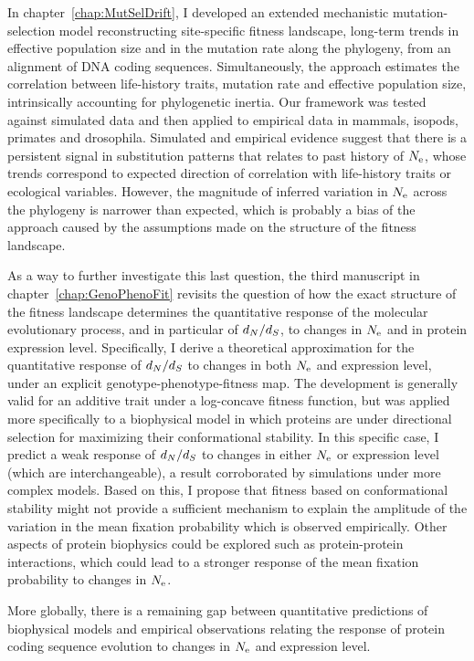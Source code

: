 In chapter~\ref{chap:MutSelDrift}, I developed an extended mechanistic mutation-selection model reconstructing site-specific fitness landscape, long-term trends in effective population size and in the mutation rate along the phylogeny, from an alignment of \acrshort{DNA} coding sequences.
Simultaneously, the approach estimates the correlation between life-history traits, mutation rate and effective population size, intrinsically accounting for phylogenetic inertia.
Our framework was tested against simulated data and then applied to empirical data in mammals, isopods, primates and drosophila.
Simulated and empirical evidence suggest that there is a persistent signal in substitution patterns that relates to past history of $N_{\text{e}}$, whose trends correspond to expected direction of correlation with life-history traits or ecological variables.
However, the magnitude of inferred variation in $N_{\text{e}}$ across the phylogeny is narrower than expected, which is probably a bias of the approach caused by the assumptions made on the structure of the fitness landscape.

As a way to further investigate this last question, the third manuscript in chapter~\ref{chap:GenoPhenoFit} revisits the question of how the exact structure of the fitness landscape determines the quantitative response of the molecular evolutionary process, and in particular of $d_N / d_S$, to changes in $N_{\text{e}}$ and in protein expression level.
Specifically, I derive a theoretical approximation for the quantitative response of $d_N / d_S$ to changes in both $N_{\text{e}}$ and expression level, under an explicit genotype-phenotype-fitness map.
The development is generally valid for an additive trait under a log-concave fitness function, but was applied more specifically to a biophysical model in which proteins are under directional selection for maximizing their conformational stability.
In this specific case, I predict a weak response of $d_N / d_S$ to changes in either $N_{\text{e}}$ or expression level (which are interchangeable), a result corroborated by simulations under more complex models.
Based on this, I propose that fitness based on conformational stability might not provide a sufficient mechanism to explain the amplitude of the variation in the mean fixation probability which is observed empirically.
Other aspects of protein biophysics could be explored such as protein-protein interactions, which could lead to a stronger response of the mean fixation probability to changes in $N_{\text{e}}$.

More globally, there is a remaining gap between quantitative predictions of biophysical models and empirical observations relating the response of protein coding sequence evolution to changes in $N_{\text{e}}$ and expression level.


